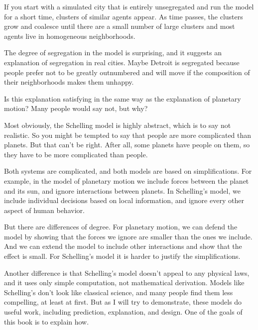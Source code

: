 \documentclass[12pt]{book}
\theoremstyle{exercise}
\begin{document}
If you start with a simulated city that is entirely unsegregated and
run the model for a short time, clusters of similar agents appear.  As
time passes, the clusters grow and coalesce until there are a small
number of large clusters and most agents live in homogeneous
neighborhoods.


The degree of segregation in the model is surprising, and it suggests
an explanation of segregation in real cities.  Maybe Detroit is
segregated because people prefer not to be greatly outnumbered and
will move if the composition of their neighborhoods makes them
unhappy.


Is this explanation satisfying in the same way as the explanation of
planetary motion?  Many people would say not, but why?

Most obviously, the Schelling model is highly abstract, which is to
say not realistic.  So you might be tempted to say that people are more complicated than planets.  But that can't be right.  After all, some planets have people on them, so they have to be more complicated than people.


Both systems are complicated, and both models are based on
simplifications.  For example, in the model of planetary motion we
include forces between the planet and its sun, and ignore interactions
between planets.  In Schelling's model, we include individual decisions
based on local information, and ignore every other aspect of human behavior. 


But there are differences of degree.
For planetary motion, we can defend
the model by showing that the forces we ignore are smaller than the
ones we include.  And we can extend the model to include other
interactions and show that the effect is small.  For Schelling's model
it is harder to justify the simplifications.


Another difference is that Schelling's model doesn't appeal to any
physical laws, and it uses only simple computation, not mathematical
derivation.  Models like Schelling's don't look like classical
science, and many people find them less compelling, at least at first.
But as I will try to demonstrate, these models do useful work,
including prediction, explanation, and design.  One of the goals of
this book is to explain how.
\end{document}
